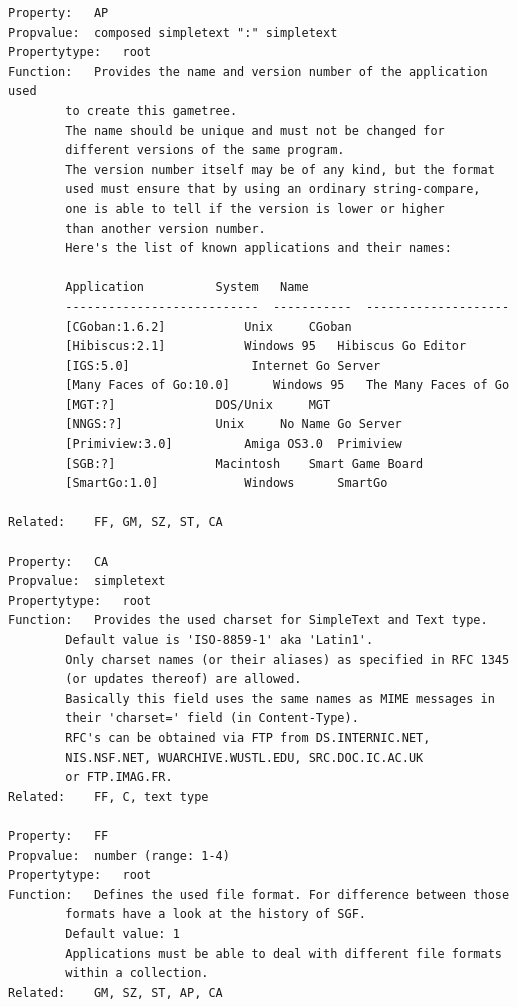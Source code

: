 \begin{verbatim}
Property:   AP
Propvalue:  composed simpletext ":" simpletext
Propertytype:   root
Function:   Provides the name and version number of the application used
        to create this gametree.
        The name should be unique and must not be changed for
        different versions of the same program.
        The version number itself may be of any kind, but the format
        used must ensure that by using an ordinary string-compare,
        one is able to tell if the version is lower or higher
        than another version number.
        Here's the list of known applications and their names:

        Application          System   Name
        ---------------------------  -----------  --------------------
        [CGoban:1.6.2]           Unix     CGoban
        [Hibiscus:2.1]           Windows 95   Hibiscus Go Editor
        [IGS:5.0]                 Internet Go Server
        [Many Faces of Go:10.0]      Windows 95   The Many Faces of Go
        [MGT:?]              DOS/Unix     MGT
        [NNGS:?]             Unix     No Name Go Server
        [Primiview:3.0]          Amiga OS3.0  Primiview
        [SGB:?]              Macintosh    Smart Game Board
        [SmartGo:1.0]            Windows      SmartGo

Related:    FF, GM, SZ, ST, CA

Property:   CA
Propvalue:  simpletext
Propertytype:   root
Function:   Provides the used charset for SimpleText and Text type.
        Default value is 'ISO-8859-1' aka 'Latin1'.
        Only charset names (or their aliases) as specified in RFC 1345
        (or updates thereof) are allowed.
        Basically this field uses the same names as MIME messages in
        their 'charset=' field (in Content-Type).
        RFC's can be obtained via FTP from DS.INTERNIC.NET,
        NIS.NSF.NET, WUARCHIVE.WUSTL.EDU, SRC.DOC.IC.AC.UK
        or FTP.IMAG.FR.
Related:    FF, C, text type

Property:   FF
Propvalue:  number (range: 1-4)
Propertytype:   root
Function:   Defines the used file format. For difference between those
        formats have a look at the history of SGF.
        Default value: 1
        Applications must be able to deal with different file formats
        within a collection.
Related:    GM, SZ, ST, AP, CA


\end{verbatim}
